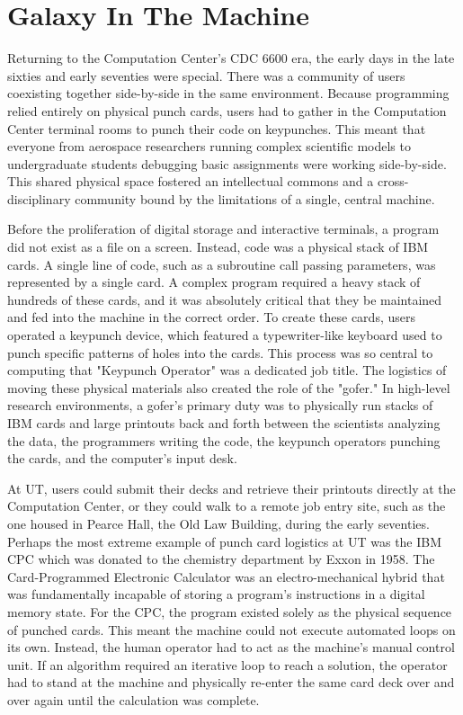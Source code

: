 \chapter{Galaxy In The Machine}

Returning to the Computation Center’s CDC 6600 era, the early days in the late sixties and early seventies were special. There was a community of users coexisting together side-by-side in the same environment. Because programming relied entirely on physical punch cards, users had to gather in the Computation Center terminal rooms to punch their code on keypunches. This meant that everyone from aerospace researchers running complex scientific models to undergraduate students debugging basic assignments were working side-by-side. This shared physical space fostered an intellectual commons and  a cross-disciplinary community bound by the limitations of a single, central machine.

Before the proliferation of digital storage and interactive terminals, a program did not exist as a file on a screen. Instead, code was a physical stack of IBM cards. A single line of code, such as a subroutine call passing parameters, was represented by a single card. A complex program required a heavy stack of hundreds of these cards, and it was absolutely critical that they be maintained and fed into the machine in the correct order. To create these cards, users operated a keypunch device, which featured a typewriter-like keyboard used to punch specific patterns of holes into the cards. This process was so central to computing that "Keypunch Operator" was a dedicated job title. The logistics of moving these physical materials also created the role of the "gofer." In high-level research environments, a gofer's primary duty was to physically run stacks of IBM cards and large printouts back and forth between the scientists analyzing the data, the programmers writing the code, the keypunch operators punching the cards, and the computer's input desk. 

At UT, users could submit their decks and retrieve their printouts directly at the Computation Center, or they could walk to a remote job entry site, such as the one housed in Pearce Hall, the Old Law Building, during the early seventies. Perhaps the most extreme example of punch card logistics at UT was the IBM CPC which was donated to the chemistry department by Exxon in 1958. The Card-Programmed Electronic Calculator was an electro-mechanical hybrid that was fundamentally incapable of storing a program's instructions in a digital memory state. For the CPC, the program existed solely as the physical sequence of punched cards. This meant the machine could not execute automated loops on its own. Instead, the human operator had to act as the machine's manual control unit. If an algorithm required an iterative loop to reach a solution, the operator had to stand at the machine and physically re-enter the same card deck over and over again until the calculation was complete.

